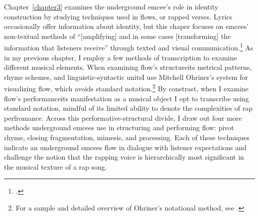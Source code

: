 Chapter~\ref{chapter3} examines the underground emcee's role in identity construction by studying 
techniques used in flows, or rapped verses. Lyrics occasionally offer information about identity,
but this chaper focuses on emcees' non-textual methods of ``[amplifying] and in some cases [transforming]
the information that listeners receive'' through texted and visual communication.\footnote{
    \autocite[12]{lorenkajikawaSoundingRaceRap2015}.} 
As in my previous chapter, I employ a few methods of transcription to examine different musical
elements. When examining flow's structure\textemdash its metrical patterns, rhyme schemes, and 
linguistic-syntactic units\textemdash I use Mitchell Ohriner's system for visualizing flow, which
avoids standard notation.\footnote{
    For a sample and detailed overview of Ohriner's notational method, see 
    \autocite[xxvii--xl]{mitchellohrinerFlowRhythmicVoice2019}.}
By constrast, when I examine flow's performance\textemdash its manifestation as a musical object\textemdash
I opt to transcribe using standard notation, mindful of its limited ability to denote the complexities
of rap perfromance. Across this performative-structural divide, I draw out four more methods underground
emcees use in structuring and performing flow: pivot rhyme, closing fragmentation, mimesis, and processing.
Each of these techniques indicate an underground emcees flow in dialogue with listener expectations and
challenge the notion that the rapping voice is hierarchically most significant in the musical texture
of a rap song.